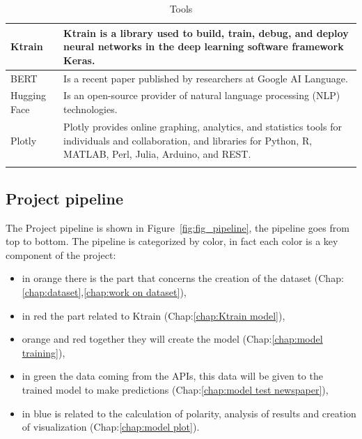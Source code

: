 \begin{longtable}[ c ]{| m{4cm} | m{10cm}|}
{Ktrain}   & {Ktrain is a library used to build, train, debug, and deploy neural networks in the deep learning software framework Keras.}      \\ \hline
{BERT}   & {Is a recent paper published by researchers at Google AI Language.}      \\ \hline
{Hugging Face}   & {Is an open-source provider of natural language processing (NLP) technologies.} \\ \hline
{Plotly}   & {Plotly provides online graphing, analytics, and statistics tools for individuals and collaboration, and libraries for Python, R, MATLAB, Perl, Julia, Arduino, and REST.}   \\ \hline

 

\caption{Tools}
\label{tab:Tools}\\
\end{longtable}

\subsection{Project pipeline}
The Project pipeline is shown in Figure~\ref{fig:fig_pipeline}, the pipeline goes from top to bottom.
The pipeline is categorized by color, in fact each color is a key component of the project:
\begin{itemize}
    \item in orange there is the part that concerns the creation of the dataset (Chap:\ref{chap:dataset},\ref{chap:work on dataset}),
    \item in red the part related to Ktrain (Chap:\ref{chap:Ktrain model}),
    \item orange and red together they will create the model (Chap:\ref{chap:model training}),
    \item in green the data coming from the APIs, this data will be given to the trained model to make predictions (Chap:\ref{chap:model test newspaper}),
    \item in blue is related to the calculation of polarity, analysis of results and creation of visualization (Chap:\ref{chap:model plot}). 
\end{itemize}
  
